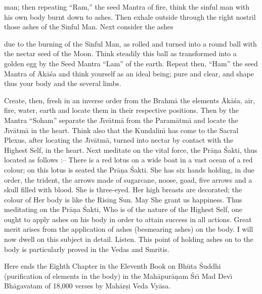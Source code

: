 man; then repeating ``Ram,'' the seed Mantra of fire, think the sinful man with his own body burnt down to ashes. Then exhale outside through the right nostril those ashes of the Sinful Man. Next consider the ashes

due to the burning of the Sinful Man, as rolled and turned into a round ball with the nectar seed of the Moon. Think steadily this ball as transformed into a golden egg by the Seed Mantra ``Lam'' of the earth. Repeat then, ``Ham'' the seed Mantra of \=Ak\=a\'sa and think yourself as an ideal being; pure and clear, and shape thus your body and the several limbs.

Create, then, fresh in an inverse order from the Brahm\=a the elements \=Ak\=a\'sa, air, fire, water, earth and locate them in their respective positions. Then by the Mantra ``Soham'' separate the J\={\i}v\=atm\=a from the Param\=atm\=a and locate the J\={\i}v\=atm\=a in the heart. Think also that the Kundalin\={\i} has come to the Sacral Plexus, after locating the J\={\i}v\=atm\=a, turned into nectar by contact with the Highest Self, in the heart. Next meditate on the vital force, the Pr\=a\d{n}a \'Sakti, thus located as follows :-- There is a red lotus on a wide boat in a vast ocean of a red colour; on this lotus is seated the Pr\=a\d{n}a \'Sakti. She has six hands holding, in due order, the trident, the arrows made of sugarcane, noose, goad, five arrows and a skull filled with blood. She is three-eyed. Her high breasts are decorated; the colour of Her body is like the Rising Sun. May She grant us happiness. Thus meditating on the Pr\=a\d{n}a \'Sakti, Who is of the nature of the Highest Self, one ought to apply ashes on his body in order to attain success in all actions. Great merit arises from the application of ashes (besmearing ashes) on the body. I will now dwell on this subject in detail. Listen. This point of holding ashes on to the body is particularly proved in the Vedas and Smritis.

Here ends the Eighth Chapter in the Eleventh Book on Bh\=uta \'Suddhi (purification of elements in the body) in the Mah\=apur\=a\d{n}am \'Sr\={\i} Mad Dev\={\i} Bh\=agavatam of 18,000 verses by Mah\=ar\d{s}i Veda Vy\=asa.



